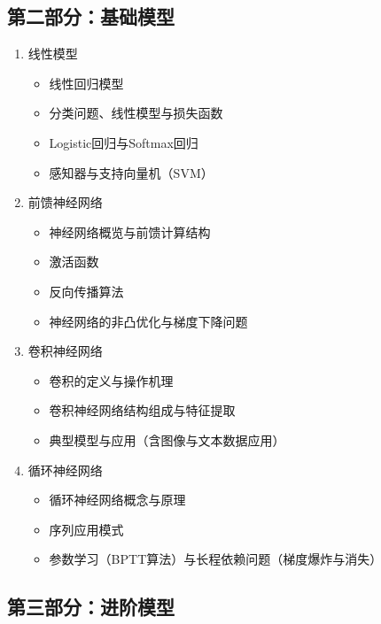 \documentclass{../nndlcourse}
\begin{document}
\subsection*{第二部分：基础模型}

\begin{enumerate}
    \item 线性模型
    \begin{itemize}
        \item 线性回归模型
        \item 分类问题、线性模型与损失函数
        \item Logistic回归与Softmax回归
        \item 感知器与支持向量机（SVM）
    \end{itemize}
    \item 前馈神经网络
    \begin{itemize}
        \item 神经网络概览与前馈计算结构
        \item 激活函数
        \item 反向传播算法
        \item 神经网络的非凸优化与梯度下降问题
    \end{itemize}
    \item 卷积神经网络
    \begin{itemize}
        \item 卷积的定义与操作机理
        \item 卷积神经网络结构组成与特征提取
        \item 典型模型与应用（含图像与文本数据应用）
    \end{itemize}
    \item 循环神经网络
    \begin{itemize}
        \item 循环神经网络概念与原理 
        \item 序列应用模式 
        \item 参数学习（BPTT算法）与长程依赖问题（梯度爆炸与消失）
    \end{itemize}
\end{enumerate}

\subsection*{第三部分：进阶模型}
\end{document}
